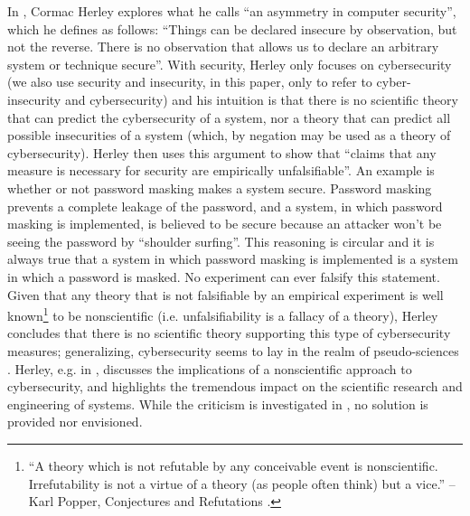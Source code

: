 \documentclass[conference]{IEEEtran}
\begin{document}
In \autocite{Herley2016unfalsifiability}, Cormac Herley explores what he calls
``an asymmetry in computer security'', which he defines as follows: ``Things
can be declared insecure by observation, but not the reverse. There is no
observation that allows us to declare an arbitrary system or technique
secure''. With security, Herley only focuses on cybersecurity (we also use
security and insecurity, in this paper, only to refer to cyber-insecurity and
cybersecurity) and his intuition is that there is no scientific theory that can
predict the cybersecurity of a system, nor a theory that can predict all
possible insecurities of a system (which, by negation may be used as a theory
of cybersecurity).  Herley then uses this argument to show that ``claims that
any measure is necessary for security are empirically unfalsifiable''. An
example is whether or not password masking makes a system secure. Password
masking prevents a complete leakage of the password, and a system, in which
password masking is implemented, is believed to be secure because an attacker
won't be seeing the password by ``shoulder surfing''.  This reasoning
is circular and it is always true that a system in which password masking is
implemented is a system in which a password is masked. No experiment can ever
falsify this statement.  Given that any theory that is not falsifiable by an
empirical experiment is well known\footnote{``A theory which is not refutable
by any conceivable event is nonscientific. Irrefutability is not a virtue of a
theory (as people often think) but a vice.'' -- Karl Popper, Conjectures and
Refutations \autocite{popper1962conjectures}.} to be nonscientific (i.e.
unfalsifiability is a fallacy of a theory), Herley concludes that there is no
scientific theory supporting this type of cybersecurity measures; generalizing,
cybersecurity seems to lay in the realm of pseudo-sciences
\autocite{Herley2016usenixvideo}. Herley, e.g.  in
\autocite{Herley2017justifying}, discusses the implications of a nonscientific
approach to cybersecurity, and highlights the tremendous impact on the
scientific research and engineering of systems. While the criticism is
investigated in \autocite{Herley2016unfalsifiability}, no solution is provided
nor envisioned.  
\end{document}
